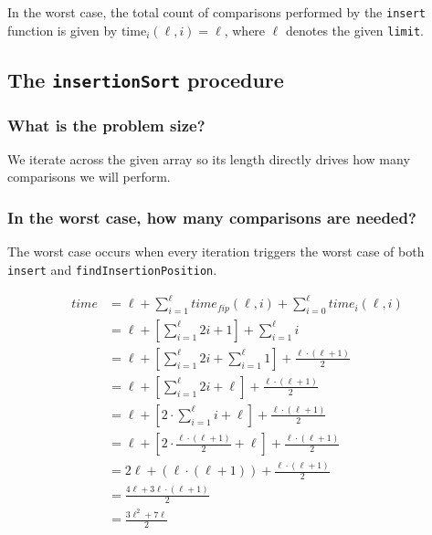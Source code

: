 \documentclass[11pt]{article}
\begin{document}
In the worst case, the total count of comparisons performed by the
\texttt{insert} function is given by \(\text{time}_{i}(\ell, i)=\ell\),
where \(\ell\) denotes the given \texttt{limit}.


\subsection{The \texttt{insertionSort} procedure}
\label{sec:org7b32164}

\subsubsection{What is the problem size?}
\label{sec:org440a10d}

We iterate across the given array so its length directly drives
how many comparisons we will perform.

\subsubsection{In the worst case, how many comparisons are needed?}
\label{sec:org0db9562}

The worst case occurs when every iteration triggers the worst case
of both  \texttt{insert} and \texttt{findInsertionPosition}.

\begin{align*}
  time &= \ell + \sum_{i=1}^{\ell} time_{fip}(\ell, i) + \sum_{i=0}^{\ell} time_{i}(\ell, i) \\
       &= \ell + \left[ \sum_{i=1}^{\ell} 2i + 1 \right] + \sum_{i=1}^{\ell} i \\
       &= \ell + \left[ \sum_{i=1}^{\ell} 2i + \sum_{i=1}^{\ell} 1 \right] + \frac{\ell\cdot(\ell+1)}{2} \\
       &= \ell + \left[ \sum_{i=1}^{\ell} 2i + \ell \right] + \frac{\ell\cdot(\ell+1)}{2} \\
       &= \ell + \left[ 2 \cdot \sum_{i=1}^{\ell} i + \ell \right] + \frac{\ell\cdot(\ell+1)}{2} \\
       &= \ell + \left[ 2 \cdot \frac{\ell\cdot(\ell+1)}{2}  + \ell \right] + \frac{\ell\cdot(\ell+1)}{2} \\
       &= 2\ell + (\ell\cdot(\ell+1))  + \frac{\ell\cdot(\ell+1)}{2} \\
       &= \frac{4\ell+3\ell\cdot(\ell+1)}{2} \\
       &= \frac{3\ell^2 + 7\ell}{2} \\
\end{align*}
\end{document}
